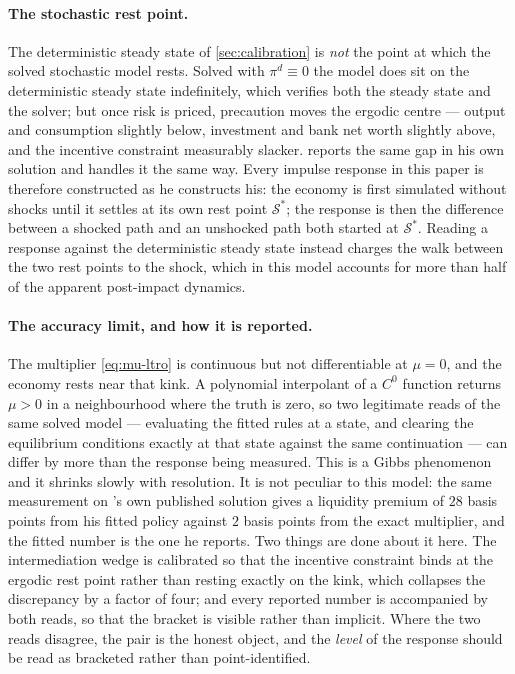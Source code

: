 \paragraph{The stochastic rest point.} The deterministic steady state of
\cref{sec:calibration} is \emph{not} the point at which the solved stochastic
model rests. Solved with $\pi^{d}\equiv0$ the model does sit on the deterministic
steady state indefinitely, which verifies both the steady state and the solver;
but once risk is priced, precaution moves the ergodic centre --- output and
consumption slightly below, investment and bank net worth slightly above, and the
incentive constraint measurably slacker. \citet{bocola2016pass} reports the same
gap in his own solution and handles it the same way. Every impulse response in
this paper is therefore constructed as he constructs his: the economy is first
simulated without shocks until it settles at its own rest point $\mathcal{S}^{*}$;
the response is then the difference between a shocked path and an unshocked path
both started at $\mathcal{S}^{*}$. Reading a response against the deterministic
steady state instead charges the walk between the two rest points to the shock,
which in this model accounts for more than half of the apparent post-impact
dynamics.

\paragraph{The accuracy limit, and how it is reported.}
\label{sec:kink}
The multiplier \eqref{eq:mu-ltro} is continuous but not differentiable at
$\mu=0$, and the economy rests near that kink. A polynomial interpolant of a
$C^{0}$ function returns $\mu>0$ in a neighbourhood where the truth is zero, so
two legitimate reads of the same solved model --- evaluating the fitted rules at a
state, and clearing the equilibrium conditions exactly at that state against the
same continuation --- can differ by more than the response being measured. This is
a Gibbs phenomenon and it shrinks slowly with resolution. It is not peculiar to
this model: the same measurement on \citet{bocola2016pass}'s own published
solution gives a liquidity premium of $28$ basis points from his fitted policy
against $2$ basis points from the exact multiplier, and the fitted number is the
one he reports. Two things are done about it here. The intermediation wedge is
calibrated so that the incentive constraint binds at the ergodic rest point
rather than resting exactly on the kink, which collapses the discrepancy by a
factor of four; and every reported number is accompanied by both reads, so that
the bracket is visible rather than implicit. Where the two reads disagree, the
pair is the honest object, and the \emph{level} of the response should be read as
bracketed rather than point-identified.
